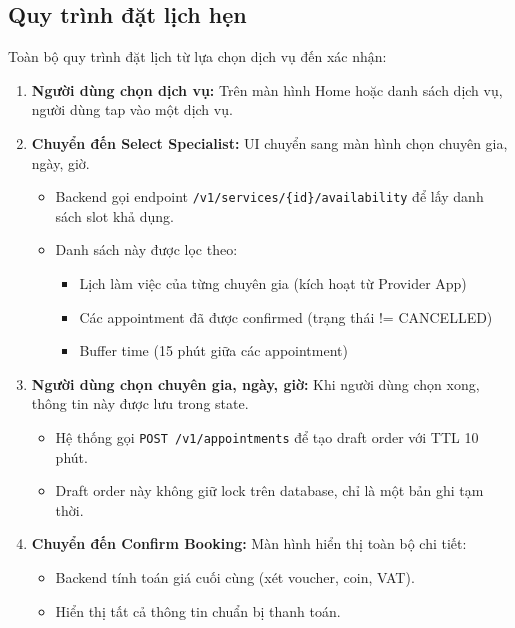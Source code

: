 \subsection{Quy trình đặt lịch hẹn}

Toàn bộ quy trình đặt lịch từ lựa chọn dịch vụ đến xác nhận:

\begin{enumerate}
    \item \textbf{Người dùng chọn dịch vụ:} Trên màn hình Home hoặc danh sách dịch vụ, người dùng tap vào một dịch vụ.
    
    \item \textbf{Chuyển đến Select Specialist:} UI chuyển sang màn hình chọn chuyên gia, ngày, giờ.
    \begin{itemize}
        \item Backend gọi endpoint \texttt{/v1/services/\{id\}/availability} để lấy danh sách slot khả dụng.
        \item Danh sách này được lọc theo:
        \begin{itemize}
            \item Lịch làm việc của từng chuyên gia (kích hoạt từ Provider App)
            \item Các appointment đã được confirmed (trạng thái != CANCELLED)
            \item Buffer time (15 phút giữa các appointment)
        \end{itemize}
    \end{itemize}
    
    \item \textbf{Người dùng chọn chuyên gia, ngày, giờ:} Khi người dùng chọn xong, thông tin này được lưu trong state.
    \begin{itemize}
        \item Hệ thống gọi \texttt{POST /v1/appointments} để tạo draft order với TTL 10 phút.
        \item Draft order này không giữ lock trên database, chỉ là một bản ghi tạm thời.
    \end{itemize}
    
    \item \textbf{Chuyển đến Confirm Booking:} Màn hình hiển thị toàn bộ chi tiết:
    \begin{itemize}
        \item Backend tính toán giá cuối cùng (xét voucher, coin, VAT).
        \item Hiển thị tất cả thông tin chuẩn bị thanh toán.
    \end{itemize}
    

\end{enumerate}
